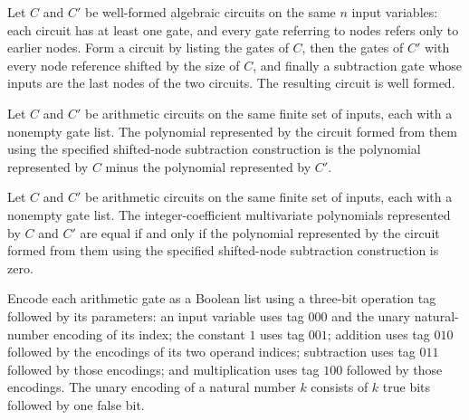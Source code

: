 \begin{theorem}
\label{Randomized.AlgCircuit.WellFormed.subCircuit}
\leanok
{}
Let $C$ and $C'$ be well-formed algebraic circuits on the same $n$ input variables: each
circuit has at least one gate, and every gate referring to nodes refers only to earlier
nodes. Form a circuit by listing the gates of $C$, then the gates of $C'$ with every
node reference shifted by the size of $C$, and finally a subtraction gate whose inputs
are the last nodes of the two circuits. The resulting circuit is well formed.
\end{theorem}

\begin{theorem}
\label{Randomized.AlgCircuit.toMvPolynomial_subCircuit}
\leanok
{}
Let $C$ and $C'$ be arithmetic circuits on the same finite set of inputs, each with a
nonempty gate list. The polynomial represented by the circuit formed from them using the
specified shifted-node subtraction construction is the polynomial represented by $C$
minus the polynomial represented by $C'$.
\end{theorem}

\begin{theorem}
\label{Randomized.AlgCircuit.toMvPolynomial_eq_iff_subCircuit}
\leanok
{}
Let $C$ and $C'$ be arithmetic circuits on the same finite set of inputs, each with a
nonempty gate list. The integer-coefficient multivariate polynomials represented by $C$
and $C'$ are equal if and only if the polynomial represented by the circuit formed from
them using the specified shifted-node subtraction construction is zero.
\end{theorem}

\begin{definition}
\label{Randomized.AlgGate.encode}
\leanok
{}
Encode each arithmetic gate as a Boolean list using a three-bit operation tag followed
by its parameters: an input variable uses tag $000$ and the unary natural-number
encoding of its index; the constant $1$ uses tag $001$; addition uses tag $010$ followed
by the encodings of its two operand indices; subtraction uses tag $011$ followed by
those encodings; and multiplication uses tag $100$ followed by those encodings. The
unary encoding of a natural number $k$ consists of $k$ true bits followed by one false
bit.
\end{definition}

